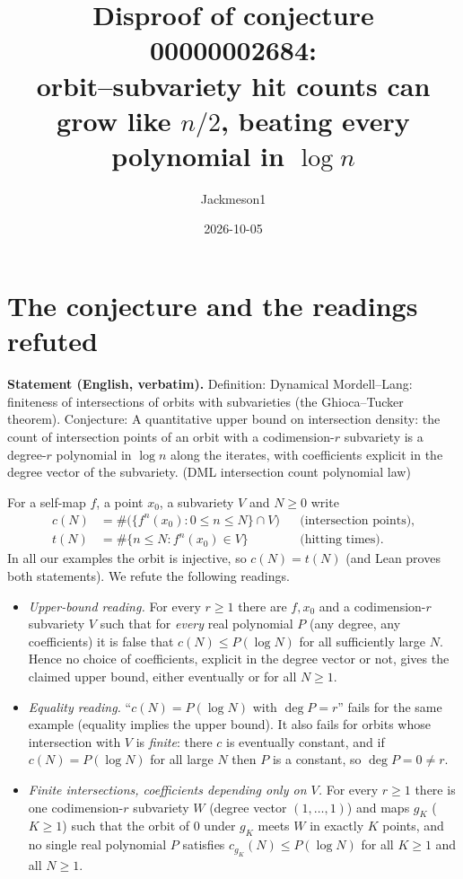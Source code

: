 \documentclass[11pt]{article}
\title{Disproof of conjecture 00000002684:\\ orbit--subvariety hit counts can grow like $n/2$, beating every polynomial in $\log n$}
\author{Jackmeson1}
\date{2026-10-05}
\theoremstyle{definition}
\theoremstyle{remark}
\begin{document}
\maketitle

\section{The conjecture and the readings refuted}

\textbf{Statement (English, verbatim).} Definition: Dynamical Mordell--Lang: finiteness of
intersections of orbits with subvarieties (the Ghioca--Tucker theorem). Conjecture: A quantitative
upper bound on intersection density: the count of intersection points of an orbit with a
codimension-$r$ subvariety is a degree-$r$ polynomial in $\log n$ along the iterates, with
coefficients explicit in the degree vector of the subvariety. (DML intersection count polynomial law)

For a self-map $f$, a point $x_0$, a subvariety $V$ and $N\ge 0$ write
\begin{align*}
  c(N)&=\#\bigl(\{f^n(x_0):0\le n\le N\}\cap V\bigr) && \text{(intersection points)},\\
  t(N)&=\#\{n\le N: f^n(x_0)\in V\} && \text{(hitting times)}.
\end{align*}
In all our examples the orbit is injective, so $c(N)=t(N)$ (and Lean proves both statements).
We refute the following readings.
\begin{itemize}
\item[(R1)] \emph{Upper-bound reading.} For every $r\ge1$ there are $f,x_0$ and a codimension-$r$
  subvariety $V$ such that for \emph{every} real polynomial $P$ (any degree, any coefficients) it is
  false that $c(N)\le P(\log N)$ for all sufficiently large $N$. Hence no choice of coefficients,
  explicit in the degree vector or not, gives the claimed upper bound, either eventually or for all
  $N\ge1$.
\item[(R2)] \emph{Equality reading.} ``$c(N)=P(\log N)$ with $\deg P=r$'' fails for the same
  example (equality implies the upper bound). It also fails for orbits whose intersection with $V$
  is \emph{finite}: there $c$ is eventually constant, and if $c(N)=P(\log N)$ for all large $N$ then
  $P$ is a constant, so $\deg P=0\neq r$.
\item[(R3)] \emph{Finite intersections, coefficients depending only on $V$.} For every $r\ge1$ there is
  one codimension-$r$ subvariety $W$ (degree vector $(1,\dots,1)$) and maps $g_K$ ($K\ge1$) such
  that the orbit of $0$ under $g_K$ meets $W$ in exactly $K$ points, and no single real polynomial $P$
  satisfies $c_{g_K}(N)\le P(\log N)$ for all $K\ge1$ and all $N\ge1$.
\end{itemize}
\end{document}
